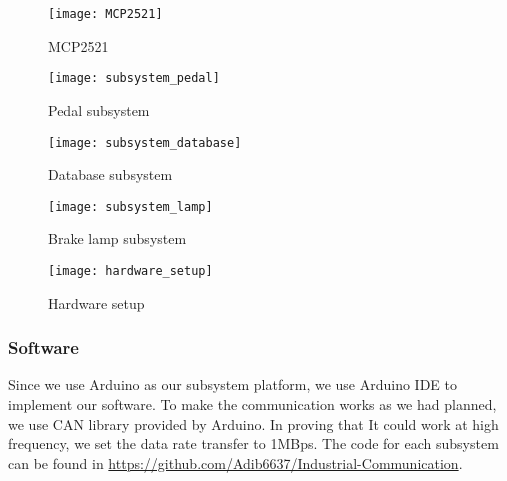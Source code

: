 \begin{figure}[h]
    \centering
    \texttt{[image: MCP2521]}
    \caption{MCP2521}
    \label{fig:MCP2521}
\end{figure}

\begin{figure}[h]
    \centering
    \texttt{[image: subsystem\_pedal]}
    \caption{Pedal subsystem}
    \label{fig:subsystem_pedal}
\end{figure}
\begin{figure}[h]
    \centering
    \texttt{[image: subsystem\_database]}
    \caption{Database subsystem}
    \label{fig:subsystem_database}
\end{figure}
\begin{figure}[h]
    \centering
    \texttt{[image: subsystem\_lamp]}
    \caption{Brake lamp subsystem}
    \label{fig:subsystem_lamp}
\end{figure}
\begin{figure}[h]
    \centering
    \texttt{[image: hardware\_setup]}
    \caption{Hardware setup}
    \label{fig:hardware_setup}
\end{figure}

\subsubsection{Software}

Since we use Arduino as our subsystem platform, we use Arduino IDE to implement our software. To make the communication works as we had planned, we use CAN library provided by Arduino. In proving that It could work at high frequency, we set the data rate transfer to 1MBps. The code for each subsystem can be found in \url{https://github.com/Adib6637/Industrial-Communication}.
